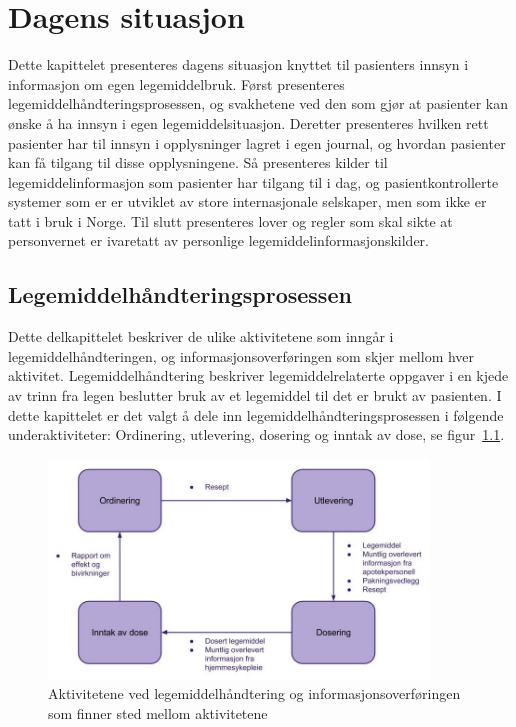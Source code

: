 \chapter{Dagens situasjon} \label{chap:dagensSituasjon}
Dette kapittelet presenteres dagens situasjon knyttet til pasienters innsyn i informasjon om egen legemiddelbruk. Først presenteres legemiddelhåndteringsprosessen, og svakhetene ved den som gjør at pasienter kan ønske å ha innsyn i egen legemiddelsituasjon. Deretter presenteres hvilken rett pasienter har til innsyn i opplysninger lagret i egen journal, og hvordan pasienter kan få tilgang til disse opplysningene. Så presenteres kilder til legemiddelinformasjon som pasienter har tilgang til i dag, og pasientkontrollerte systemer som er er utviklet av store internasjonale selskaper, men som ikke er tatt i bruk i Norge. Til slutt presenteres lover og regler som skal sikte at personvernet er ivaretatt av personlige legemiddelinformasjonskilder.
 
\section{Legemiddelhåndteringsprosessen}
Dette delkapittelet beskriver de ulike aktivitetene som inngår i legemiddelhåndteringen, og informasjonsoverføringen som skjer mellom hver aktivitet. Legemiddelhåndtering beskriver legemiddelrelaterte oppgaver i en kjede av trinn fra legen beslutter bruk av et legemiddel til det er brukt av pasienten. I dette kapittelet er det valgt å dele inn legemiddelhåndteringsprosessen i følgende underaktiviteter: Ordinering, utlevering, dosering og inntak av dose, se figur~\ref{fig:prosess}.

\begin{figure}[h]
    \centering
    \includegraphics[width=0.9\textwidth]{fig/dagens/prosess.jpg}
    \caption{Aktivitetene ved legemiddelhåndtering og informasjonsoverføringen som finner sted mellom aktivitetene}
    \label{fig:prosess}
\end{figure}

